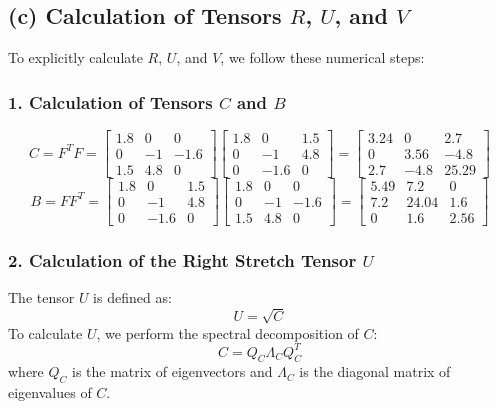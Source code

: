 \documentclass{article}
\begin{document}
\subsection{(c) Calculation of Tensors $ R $, $ U $, and $ V $}
To explicitly calculate $ R $, $ U $, and $ V $, we follow these numerical steps:

\subsubsection{1. Calculation of Tensors $ C $ and $ B $}
$$
C = F^T F = \begin{bmatrix}
1.8 & 0 & 0 \\
0 & -1 & -1.6 \\
1.5 & 4.8 & 0
\end{bmatrix}
\begin{bmatrix}
1.8 & 0 & 1.5 \\
0 & -1 & 4.8 \\
0 & -1.6 & 0
\end{bmatrix}
= \begin{bmatrix}
3.24 & 0 & 2.7 \\
0 & 3.56 & -4.8 \\
2.7 & -4.8 & 25.29
\end{bmatrix}
$$
$$
B = F F^T = \begin{bmatrix}
1.8 & 0 & 1.5 \\
0 & -1 & 4.8 \\
0 & -1.6 & 0
\end{bmatrix}
\begin{bmatrix}
1.8 & 0 & 0 \\
0 & -1 & -1.6 \\
1.5 & 4.8 & 0
\end{bmatrix}
= \begin{bmatrix}
5.49 & 7.2 & 0 \\
7.2 & 24.04 & 1.6 \\
0 & 1.6 & 2.56
\end{bmatrix}
$$

\subsubsection{2. Calculation of the Right Stretch Tensor $ U $}
The tensor $ U $ is defined as:
$$
U = \sqrt{C}
$$
To calculate $ U $, we perform the spectral decomposition of $ C $:
$$
C = Q_C \Lambda_C Q_C^T
$$
where $ Q_C $ is the matrix of eigenvectors and $ \Lambda_C $ is the diagonal matrix of eigenvalues of $ C $.
\end{document}
